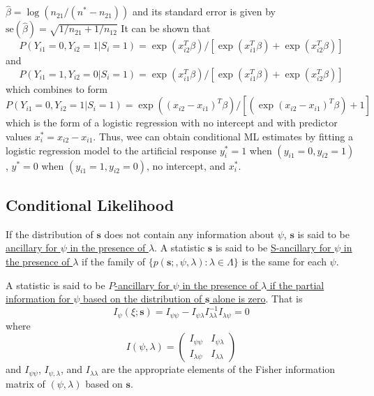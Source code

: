 \documentclass[12pt]{article}
\newcommand{\bhat}{\hat{\beta}}
\numberwithin{equation}{section}
\begin{document}
$\bhat = \log(n_{21} / (n^* - n_{21}))$ and its standard error is given by $\text{se}(\bhat) = \sqrt{1 / n_{21} + 1 / n_{12}}$
%
%
It can be shown that
\begin{equation*}
 P(Y_{i1} = 0, Y_{i2} = 1 | S_i = 1) =
   \exp(x_{i2}^T \beta) / [\exp(x_{i1}^T \beta) + \exp(x_{i2}^T \beta)]
\end{equation*}
%
and
%
\begin{equation*}
 P(Y_{i1} = 1, Y_{i2} = 0 | S_i = 1) =
   \exp(x_{i1}^T \beta) / [\exp(x_{i1}^T \beta) + \exp(x_{i2}^T \beta)]
\end{equation*}
%
which combines to form
%
\begin{equation*}
  P(Y_{i1} = 0, Y_{i2} = 1 | S_i = 1) =
   \exp((x_{i2} - x_{i1})^T \beta) / [(\exp(x_{i2} - x_{i1})^T \beta) + 1]
\end{equation*}
%
which is the form of a logistic regression with no intercept and with predictor values $x_i^* = x_{i2} - x_{i1}$. Thus, wee can obtain conditional ML estimates by fitting a logistic regression model to the artificial response $y_i^* = 1$ when 
$(y_{i1} = 0, y_{i2} = 1)$, $y^* = 0$ when $(y_{i1} = 1, y_{i2} = 0)$, no intercept, and $x_i^*$.



\subsection{Conditional Likelihood}
If the distribution of $\mathbf{s}$ does not contain any information about $\psi$, $\mathbf{s}$ is said to be \underline{ancillary for $\psi$ in the presence of $\lambda$}. A statistic $\mathbf{s}$ is said to be \underline{S-ancillary for $\psi$ in the presence of $\lambda$} if the family of 
$\{ p(\mathbf{s};, \psi, \lambda) : \lambda \in \Lambda \}$ is the same for each $\psi$.

A statistic is said to be \underline{$P$-ancillary for $\psi$ in the presence of $\lambda$ if the partial information for $\psi$ based on the distribution of $\mathbf{s}$ alone is zero}. That is
\begin{equation*}
  I_{\psi}(\xi; \mathbf{s}) = I_{\psi \psi} - I_{\psi \lambda} I^{-1}_{\lambda \lambda} I_{\lambda \psi} = 0
\end{equation*}
%
where
\begin{equation*}
  I(\psi, \lambda) = \begin{pmatrix}
  I_{\psi \psi} & I_{\psi \lambda} \\
  I_{\lambda \psi} & I_{\lambda \lambda}
  \end{pmatrix}
\end{equation*}
%
and $I_{\psi \psi}$, $I_{\psi, \lambda}$, and $I_{\lambda \lambda}$ are the appropriate elements of the Fisher information matrix of $(\psi, \lambda)$ based on $\mathbf{s}$.
\end{document}

